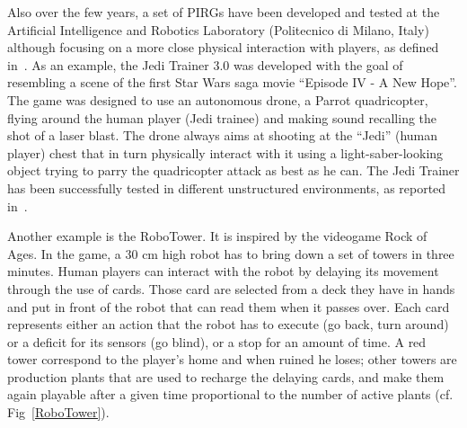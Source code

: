 Also over the few years, a set of PIRGs have been developed and tested at the Artificial Intelligence and Robotics Laboratory (Politecnico di Milano, Italy) although focusing on a more close physical interaction with players, as defined in~\cite{martinoia2013physically}. As an example, the Jedi Trainer 3.0 was developed with the goal of resembling a scene of the first Star Wars saga movie ``Episode IV - A New Hope''. The game was designed to use an autonomous drone, a Parrot quadricopter, flying around the human player (Jedi trainee) and making sound recalling the shot of a laser blast. The drone always aims at shooting at the ``Jedi'' (human player) chest that in turn physically interact with it using a light-saber-looking object trying to parry the quadricopter attack as best as he can. The Jedi Trainer has been successfully tested in different unstructured environments, as reported in~\cite{Bonarini2014,martinoia2013physically}.


Another example is the RoboTower. It is inspired by the videogame Rock of Ages. In the game, a 30 cm high robot has to bring down a set of towers in three minutes. Human players can interact with the robot by delaying its movement through the use of cards. Those card are selected from a deck they have in hands and put in front of the robot that can read them when it passes over. Each card represents either an action that the robot has to execute (go back, turn around) or a deficit for its sensors (go blind), or a stop for an amount of time. A red tower correspond to the player's home and when ruined he loses; other towers are production plants that are used to recharge the delaying cards, and make them again playable after a given time proportional to the number of active plants (cf. Fig~\ref{RoboTower}).


